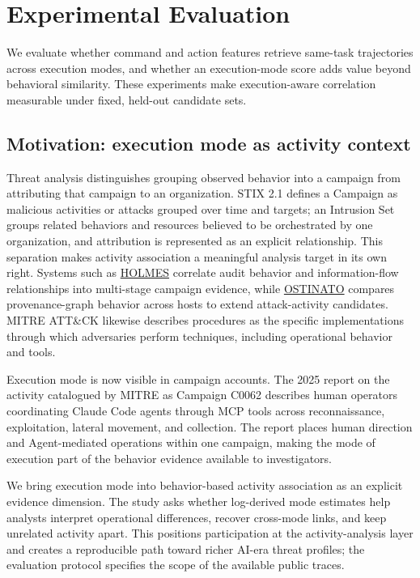 \section{Experimental Evaluation}
\label{sec:experimental-evaluation}

We evaluate whether command and action features retrieve same-task trajectories across execution modes, and whether an execution-mode score adds value beyond behavioral similarity. These experiments make execution-aware correlation measurable under fixed, held-out candidate sets.

\subsection{Motivation: execution mode as activity context}
\label{sec:motivation}

Threat analysis distinguishes grouping observed behavior into a campaign from attributing that campaign to an organization. STIX 2.1 defines a Campaign as malicious activities or attacks grouped over time and targets; an Intrusion Set groups related behaviors and resources believed to be orchestrated by one organization, and attribution is represented as an explicit relationship. This separation makes activity association a meaningful analysis target in its own right. Systems such as \href{https://www.seclab.cs.sunysb.edu/seclab/pubs/holmes19.pdf}{HOLMES} correlate audit behavior and information-flow relationships into multi-stage campaign evidence, while \href{https://arxiv.org/abs/2312.09321}{OSTINATO} compares provenance-graph behavior across hosts to extend attack-activity candidates. MITRE ATT\&CK likewise describes procedures as the specific implementations through which adversaries perform techniques, including operational behavior and tools.

Execution mode is now visible in campaign accounts. The 2025 report on the activity catalogued by MITRE as Campaign C0062 describes human operators coordinating Claude Code agents through MCP tools across reconnaissance, exploitation, lateral movement, and collection. The report places human direction and Agent-mediated operations within one campaign, making the mode of execution part of the behavior evidence available to investigators.

We bring execution mode into behavior-based activity association as an explicit evidence dimension. The study asks whether log-derived mode estimates help analysts interpret operational differences, recover cross-mode links, and keep unrelated activity apart. This positions participation at the activity-analysis layer and creates a reproducible path toward richer AI-era threat profiles; the evaluation protocol specifies the scope of the available public traces.

